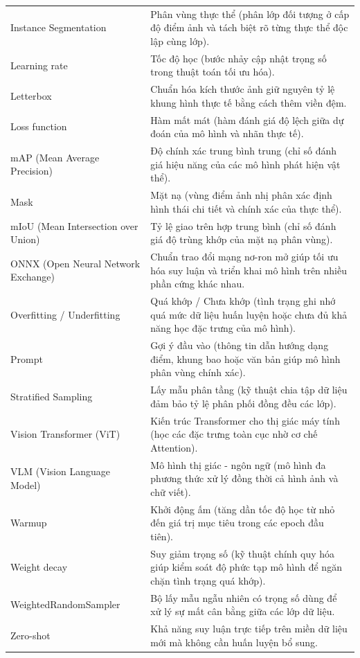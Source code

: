 \begin{longtable}{p{5.2cm} p{10.8cm}}
    Instance Segmentation & Phân vùng thực thể (phân lớp đối tượng ở cấp độ điểm ảnh và tách biệt rõ từng thực thể độc lập cùng lớp). \\
    Learning rate & Tốc độ học (bước nhảy cập nhật trọng số trong thuật toán tối ưu hóa). \\
    Letterbox & Chuẩn hóa kích thước ảnh giữ nguyên tỷ lệ khung hình thực tế bằng cách thêm viền đệm. \\
    Loss function & Hàm mất mát (hàm đánh giá độ lệch giữa dự đoán của mô hình và nhãn thực tế). \\
    mAP (Mean Average Precision) & Độ chính xác trung bình trung (chỉ số đánh giá hiệu năng của các mô hình phát hiện vật thể). \\
    Mask & Mặt nạ (vùng điểm ảnh nhị phân xác định hình thái chi tiết và chính xác của thực thể). \\
    mIoU (Mean Intersection over Union) & Tỷ lệ giao trên hợp trung bình (chỉ số đánh giá độ trùng khớp của mặt nạ phân vùng). \\
    ONNX (Open Neural Network Exchange) & Chuẩn trao đổi mạng nơ-ron mở giúp tối ưu hóa suy luận và triển khai mô hình trên nhiều phần cứng khác nhau. \\
    Overfitting / Underfitting & Quá khớp / Chưa khớp (tình trạng ghi nhớ quá mức dữ liệu huấn luyện hoặc chưa đủ khả năng học đặc trưng của mô hình). \\
    Prompt & Gợi ý đầu vào (thông tin dẫn hướng dạng điểm, khung bao hoặc văn bản giúp mô hình phân vùng chính xác). \\
    Stratified Sampling & Lấy mẫu phân tầng (kỹ thuật chia tập dữ liệu đảm bảo tỷ lệ phân phối đồng đều các lớp). \\
    Vision Transformer (ViT) & Kiến trúc Transformer cho thị giác máy tính (học các đặc trưng toàn cục nhờ cơ chế Attention). \\
    VLM (Vision Language Model) & Mô hình thị giác - ngôn ngữ (mô hình đa phương thức xử lý đồng thời cả hình ảnh và chữ viết). \\
    Warmup & Khởi động ấm (tăng dần tốc độ học từ nhỏ đến giá trị mục tiêu trong các epoch đầu tiên). \\
    Weight decay & Suy giảm trọng số (kỹ thuật chính quy hóa giúp kiểm soát độ phức tạp mô hình để ngăn chặn tình trạng quá khớp). \\
    WeightedRandomSampler & Bộ lấy mẫu ngẫu nhiên có trọng số dùng để xử lý sự mất cân bằng giữa các lớp dữ liệu. \\
    Zero-shot & Khả năng suy luận trực tiếp trên miền dữ liệu mới mà không cần huấn luyện bổ sung.
\end{longtable}
